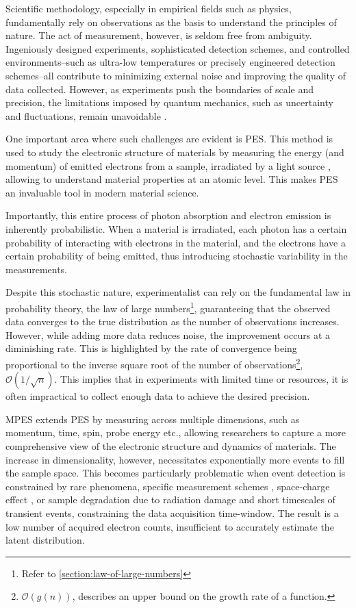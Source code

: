 Scientific methodology, especially in empirical fields such as physics, fundamentally rely on observations as the basis to understand the principles of nature. The act of measurement, however, is seldom free from ambiguity. Ingeniously designed experiments, sophisticated detection schemes, and controlled environments--such as ultra-low temperatures or precisely engineered detection schemes--all contribute to minimizing external noise and improving the quality of data collected. However, as experiments push the boundaries of scale and precision, the limitations imposed by quantum mechanics, such as uncertainty and fluctuations, remain unavoidable \cite{heisenbergPhysicalPrinciplesQuantum2009,sakuraiModernQuantumMechanics2020,binneyPhysicsQuantumMechanics2014}.

One important area where such challenges are evident is \gls{PES}. This method is used to study the electronic structure of materials by measuring the energy (and momentum) of emitted electrons from a sample, irradiated by a light source \cite{cardonaGeneralPrinciples1978}, allowing to understand material properties at an atomic level. This makes \gls{PES} an invaluable tool in modern material science. 

Importantly, this entire process of photon absorption and electron emission is inherently probabilistic. When a material is irradiated, each photon has a certain probability of interacting with electrons in the material, and the electrons have a certain probability of being emitted, thus introducing stochastic variability in the measurements.

Despite this stochastic nature, experimentalist can rely on the fundamental law in probability theory, the law of large numbers\footnote{Refer to \cref{section:law-of-large-numbers}}, guaranteeing that the observed data converges to the true distribution as the number of observations increases. However, while adding more data reduces \gls{noise}, the improvement occurs at a diminishing rate. This is highlighted by the rate of convergence being proportional to the inverse square root of the number of observations\footnote{$\mathcal{O}(g(n))$, describes an upper bound on the growth rate of a function.}, $\mathcal{O}(1/\sqrt{n})$. This implies that in experiments with limited time or resources, it is often impractical to collect enough data to achieve the desired precision.

\Gls{MPES} extends \gls{PES} by measuring across multiple dimensions, such as momentum, time, spin, probe energy etc., allowing researchers to capture a more comprehensive view of the electronic structure and dynamics of materials. The increase in dimensionality, however, necessitates exponentially more events to fill the sample space. This becomes particularly problematic when event detection is constrained by rare phenomena, specific measurement schemes \cite{maklarQuantitativeComparisonTimeflight2020}, space-charge effect \cite{schonhenseMultidimensionalPhotoemissionSpectroscopy2018}, or sample degradation due to radiation damage and short timescales of transient events, constraining the data acquisition time-window. The result is a low number of acquired electron counts, insufficient to accurately estimate the \gls{latent} distribution. 

